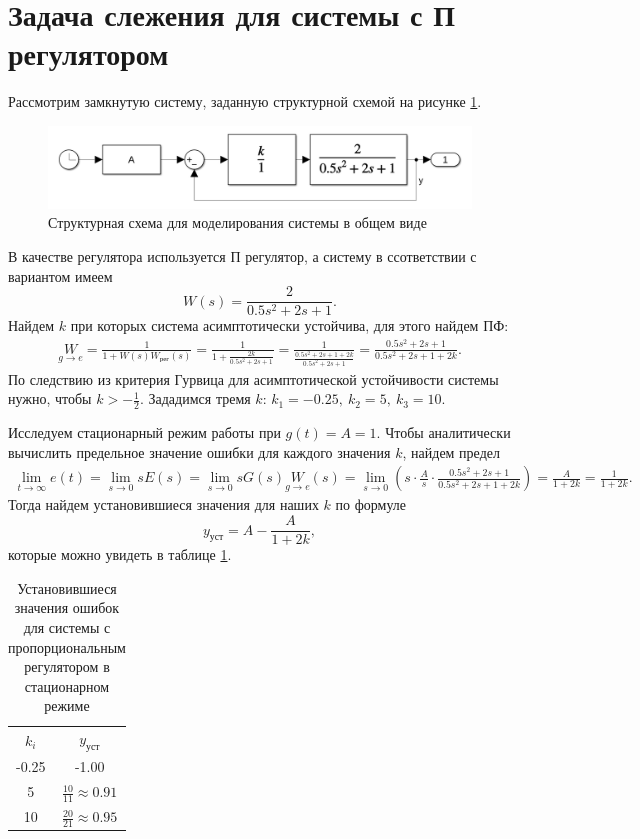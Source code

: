 \section{Задача слежения для системы с П регулятором}

Рассмотрим замкнутую систему, заданную структурной схемой на рисунке \ref{fig:task_3_xls}.
\begin{figure}[H]
    \centering
    \includegraphics[width=1\textwidth]{figs/task_3_slx.png}
    \caption{Структурная схема для моделирования системы в общем виде}
    \label{fig:task_3_xls}
\end{figure}
В качестве регулятора используется П регулятор, а систему в ссответствии с вариантом
имеем
\begin{equation*}
    W(s)=\frac{2}{0.5s^2+2s+1}.
\end{equation*}
Найдем $k$ при которых система асимптотически устойчива, для этого найдем ПФ:
\begin{multline*}
    \underset{g\rightarrow e}{W} = \frac{1}{1+W(s)W_\text{рег}(s)}
    =\frac{1}{1+\frac{2k}{0.5s^2+2s+1}}=\frac{1}{\frac{0.5s^2+2s+1+2k}{0.5s^2+2s+1}}=\frac{0.5s^2+2s+1}{0.5s^2+2s+1+2k}.
\end{multline*}
По следствию из критерия Гурвица для асимптотической устойчивости системы нужно,
чтобы $k>-\frac{1}{2}$. Зададимся тремя $k$: $k_1=-0.25,\ k_2=5,\ k_3=10$.

Исследуем стационарный режим работы при $g(t)=A=1$. Чтобы аналитически вычислить
предельное значение ошибки для каждого значения $k$, найдем предел
\begin{multline*}
    \lim_{t\rightarrow\infty}e(t)=\lim_{s\rightarrow0}sE(s)=\lim_{s\rightarrow0}sG(s)\underset{g\rightarrow e}{W}(s)
    =\lim_{s\rightarrow0}\left(s\cdot\frac{A}{s}\cdot\frac{0.5s^2+2s+1}{0.5s^2+2s+1+2k}\right)
    =\frac{A}{1+2k}=\frac{1}{1+2k}.
\end{multline*}
Тогда найдем установившиеся значения для наших $k$ по формуле
\begin{equation*}
    y_\text{уст}=A-\frac{A}{1+2k},
\end{equation*}
которые можно увидеть в таблице \ref{tab:task_3_out}.
\begin{table}[H]
    \centering
    \caption{Установившиеся значения ошибок для системы с пропорциональным регулятором в стационарном режиме}
    \begin{tabular}{|c|c|}
        \hline
        $k_i$ & $y_\text{уст}$\\[2mm]
        -0.25 & -1.00 \\[2mm]
        5 & $\frac{10}{11}\approx0.91$ \\[2mm]
        10 & $\frac{20}{21}\approx0.95$ \\[2mm]
        \hline
    \end{tabular}
    \label{tab:task_3_out}
\end{table}

